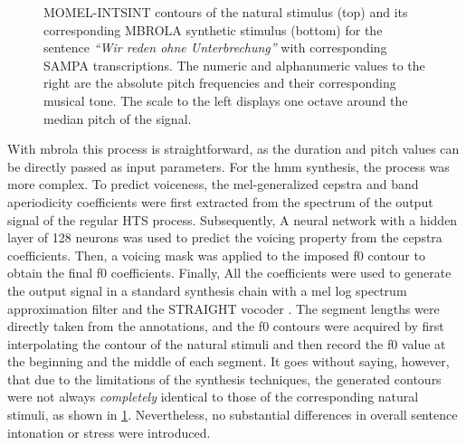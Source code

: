 %
\begin{figure}[t]
	\centering
	\caption[MOMEL comparison of natural \acs{f0} contour imposition on a synthetic stimulus]
		{MOMEL-INTSINT contours of the natural stimulus (top) and its corresponding MBROLA synthetic stimulus (bottom) for the sentence \emph{\enquote{Wir reden ohne Unterbrechung}} with corresponding SAMPA transcriptions.
		The numeric and alphanumeric values to the right are the absolute pitch frequencies and their corresponding musical tone.
		The scale to the left displays one octave around the median pitch of the signal.}
	\label{fig:momel-comparison}
\end{figure}
%
With \ac{mbrola} this process is straightforward, as the duration and pitch values can be directly passed as input parameters.
For the \ac{hmm} synthesis, the process was more complex.
To predict voiceness, the mel-generalized cepstra and band aperiodicity coefficients were first extracted from the spectrum of the output signal of the regular HTS process.
Subsequently, A neural network with a hidden layer of 128 neurons was used to predict the voicing property from the cepstra coefficients.
Then, a voicing mask was applied to the imposed \ac{f0} contour to obtain the final \ac{f0} coefficients.
Finally, All the coefficients were used to generate the output signal in a standard synthesis chain with a mel log spectrum approximation filter and the STRAIGHT vocoder \citep{Kawahara2006straight}.
The segment lengths were directly taken from the annotations, and the \ac{f0} contours were acquired by first interpolating the contour of the natural stimuli and then record the \ac{f0} value at the beginning and the middle of each segment.
It goes without saying, however, that due to the limitations of the synthesis techniques, the generated contours were not always \emph{completely} identical to those of the corresponding natural stimuli, as shown in \cref{fig:momel-comparison}.
Nevertheless, no substantial differences in overall sentence intonation or stress were introduced.

